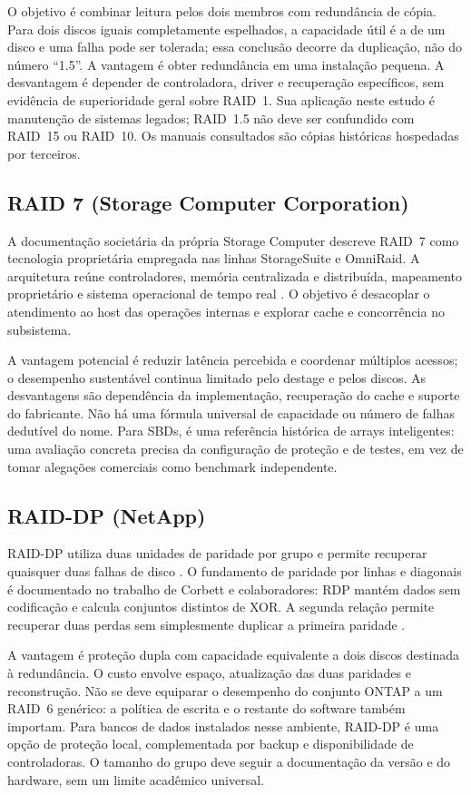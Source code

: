 \documentclass[titlepage]{article}
\begin{document}
O objetivo é combinar leitura pelos dois membros com redundância de cópia. Para dois discos iguais completamente espelhados, a capacidade útil é a de um disco e uma falha pode ser tolerada; essa conclusão decorre da duplicação, não do número ``1.5''. A vantagem é obter redundância em uma instalação pequena. A desvantagem é depender de controladora, driver e recuperação específicos, sem evidência de superioridade geral sobre RAID~1. Sua aplicação neste estudo é manutenção de sistemas legados; RAID~1.5 não deve ser confundido com RAID~15 ou RAID~10. Os manuais consultados são cópias históricas hospedadas por terceiros.

\subsection{RAID 7 (Storage Computer Corporation)}
A documentação societária da própria Storage Computer descreve RAID~7 como tecnologia proprietária empregada nas linhas StorageSuite e OmniRaid. A arquitetura reúne controladores, memória centralizada e distribuída, mapeamento proprietário e sistema operacional de tempo real \cite{storagecomputer_7}. O objetivo é desacoplar o atendimento ao host das operações internas e explorar cache e concorrência no subsistema.

A vantagem potencial é reduzir latência percebida e coordenar múltiplos acessos; o desempenho sustentável continua limitado pelo destage e pelos discos. As desvantagens são dependência da implementação, recuperação do cache e suporte do fabricante. Não há uma fórmula universal de capacidade ou número de falhas dedutível do nome. Para SBDs, é uma referência histórica de arrays inteligentes: uma avaliação concreta precisa da configuração de proteção e de testes, em vez de tomar alegações comerciais como benchmark independente.

\subsection{RAID-DP (NetApp)}
RAID-DP utiliza duas unidades de paridade por grupo e permite recuperar quaisquer duas falhas de disco \cite{netapp_raid_dp}. O fundamento de paridade por linhas e diagonais é documentado no trabalho de Corbett e colaboradores: RDP mantém dados sem codificação e calcula conjuntos distintos de XOR. A segunda relação permite recuperar duas perdas sem simplesmente duplicar a primeira paridade \cite{corbett2004}.

A vantagem é proteção dupla com capacidade equivalente a dois discos destinada à redundância. O custo envolve espaço, atualização das duas paridades e reconstrução. Não se deve equiparar o desempenho do conjunto ONTAP a um RAID~6 genérico: a política de escrita e o restante do software também importam. Para bancos de dados instalados nesse ambiente, RAID-DP é uma opção de proteção local, complementada por backup e disponibilidade de controladoras. O tamanho do grupo deve seguir a documentação da versão e do hardware, sem um limite acadêmico universal.
\end{document}
